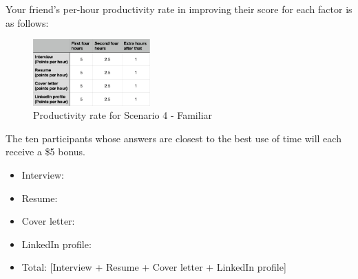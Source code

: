 Your friend’s per-hour productivity rate in improving their score for each factor is as follows:
\begin{figure}[ht]
    \centering
    \includegraphics[width=0.4\textwidth]{Figures/cost-four.png}
    \caption{Productivity rate for Scenario 4 - Familiar}
    \label{fig:survey-cost-scenario4}
\end{figure}

The ten participants whose answers are closest to the best use of time will each receive a \$5 bonus.

\begin{itemize}
    \item Interview: \underline{\hspace{3cm}}
    \item Resume: \underline{\hspace{3cm}}
    \item Cover letter: \underline{\hspace{3cm}}
    \item LinkedIn profile: \underline{\hspace{3cm}}
    \item Total: [Interview + Resume + Cover letter + LinkedIn profile]
\end{itemize}


    
